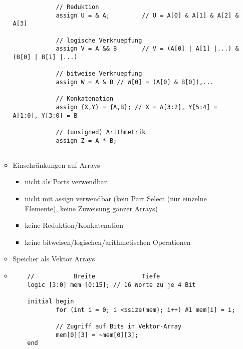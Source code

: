 \begin{itemize}
\begin{itemize}
\begin{lstlisting}
			// Reduktion
			assign U = & A; 		// U = A[0] & A[1] & A[2] & A[3]
			
			// logische Verknuepfung
			assign V = A && B 		// V = (A[0] | A[1] |...) & (B[0] | B[1] |...)
			
			// bitweise Verknuepfung 
			assign W = A & B // W[0] = (A[0] & B[0]),...
			
			// Konkatenation
			assign {X,Y} = {A,B}; // X = A[3:2], Y[5:4] = A[1:0], Y[3:0] = B
			
			// (unsigned) Arithmetrik
			assign Z = A * B;
			
		\end{lstlisting}
		
	\item Einschränkungen auf Arrays
		\begin{itemize}
		\item nicht als Ports verwendbar
		\item nicht mit assign verwendbar (kein Part Select (nur einzelne Elemente), keine Zuweisung ganzer Arrays)
		\item keine Reduktion/Konkatenation
		\item keine bitweisen/logischen/arithmetischen Operationen
		\end{itemize}
		
	\item Speicher als Vektor Arrays
	\item[]
	\begin{lstlisting}
	//			 Breite 			Tiefe
	logic [3:0] mem [0:15]; // 16 Worte zu je 4 Bit
	
	initial begin 
			for (int i = 0; i <$size(mem); i++) #1 mem[i] = i; 
			
			// Zugriff auf Bits in Vektor-Array
			mem[0][3] = ~mem[0][3];
	end
	\end{lstlisting}
	\end{itemize}

\end{itemize}



